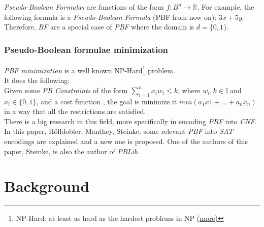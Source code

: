 \emph{Pseudo-Boolean Formulas} are functions of the form $f:B^n \rightarrow \mathbb{R}$. For example, the following formula is a \emph{Pseudo-Boolean Formula} (PBF from now on): $3x+5y$. Therefore, \emph{BF} are a special case of \emph{PBF} where the domain is $d=\{0,1\}$.\\



\subsubsection{Pseudo-Boolean formulae minimization}
\emph{PBF minimization} is a well known NP-Hard\footnote{NP-Hard: at least as hard as the hardest problems in NP \href{https://en.wikipedia.org/wiki/NP-hardness}{(more)}} problem. \\
It does the following:\\
Given some \emph{PB Constraints} of the form $\sum_{i=1}^{n} x_{i}w_{i} \leq k$, where $w_{i},k \in \mathbb{I}$ and $x_{i} \in \{0,1\}$, and a cost function , the goal is minimize it  $min(a_{1}x{1} + ... + a_{n}x_{n})$ in a way that all the restrictions are satisfied.\\

There is a big research in this field, more specifically in encoding \emph{PBF} into \emph{CNF}. In this paper, Hölldobler, Manthey, Steinke\cite{Holldobler}, some relevant \emph{PBF} into \emph{SAT} encodings are explained and a new one is proposed. One of the authors of this paper, Steinke, is also the author of \emph{PBLib}.  

\section{Background}

